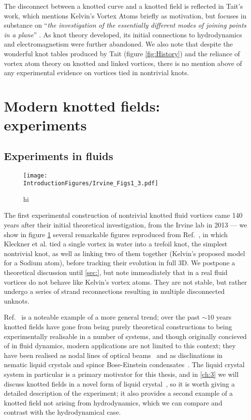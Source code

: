 The disconnect between a knotted curve and a knotted field is reflected in Tait's work, which mentions Kelvin's Vortex Atoms briefly as motivation, but focuses in substance on ``\emph{the investigation of the essentially different modes of joining points in a plane}'' \citep{Tait}. As knot theory developed, its initial connections to hydrodynamics and electromagnetism were further abandoned. We also note that despite the wonderful knot tables produced by Tait (figure \ref{fig:History}) and the reliance of vortex atom theory on knotted and linked vortices, there is no mention above of any experimental evidence on vortices tied in nontrivial knots. 

\section{Modern knotted fields: experiments}
\subsection{Experiments in fluids}
\begin{figure}[htbp]
\centering
\texttt{[image: \\IntroductionFigures/Irvine\_Figs1\_3.pdf]}
\caption{hi }
\label{fig:Irvine}
\end{figure}
The first experimental construction of nontrivial knotted fluid vortices came 140 years after their initial theoretical investigation, from the Irvine lab in 2013 --- we show in figure \ref{fig:Irvine} several remarkable figures reproduced from Ref.~\citep{Kleckner2013}, in which Kleckner et al. tied a single vortex in water into a trefoil knot, the simplest nontrivial knot, as well as linking two of them together (Kelvin's proposed model for a Sodium atom), before tracking their evolution in full 3D. We postpone a theoretical discussion until \ref{sec:}, but note immeadiately that in a real fluid vortices do not behave like Kelvin's vortex atoms. They are not stable, but rather undergo a series of strand reconnections resulting in multiple disconnected unknots.

Ref.~\citep{Kleckner2013} is a noteable example of a more general trend; over the past $\sim10$ years knotted fields have gone from being purely theoretical constructions to being experimentally realisable in a number of systems, and though originally concieved of in fluid dynamics, modern applications are not limited to this context; they have been realised as nodal lines of optical beams~\cite{Dennis2010} and as disclinations in nematic liquid crystals and spinor Bose-Einstein condensates~\cite{Tkalec2011,Tasinkevych2014,Copar2015}. The liquid crystal system in particular is a primary motivator for this thesis, and in \ref{ch:3} we will discuss knotted fields in a novel form of liquid crystal~\cite{Lavrentovich}, so it is worth giving a detailed description of the experiment; it also provides a second example of a knotted field not arising from hydrodynamics, which we can compare and contrast with the hydrodynamical case.

